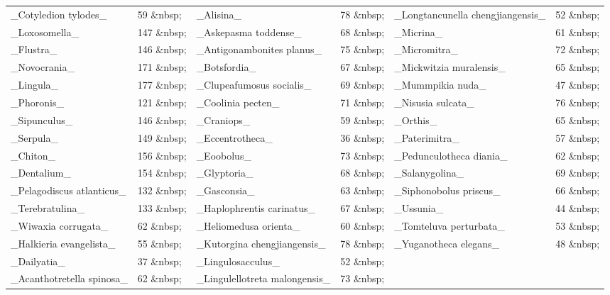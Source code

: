\documentclass[openany]{book}
\theoremstyle{definition}
\theoremstyle{definition}
\theoremstyle{definition}
\theoremstyle{remark}
\begin{document}
\begin{tabular}{l|l|l|l|l|l}
\hline
 &  &  &  &  & \\
\hline
\_Cotyledion tylodes\_ & 59   \&nbsp; & \_Alisina\_ & 78   \&nbsp; & \_Longtancunella chengjiangensis\_ & 52   \&nbsp;\\
\hline
\_Loxosomella\_ & 147   \&nbsp; & \_Askepasma toddense\_ & 68   \&nbsp; & \_Micrina\_ & 61   \&nbsp;\\
\hline
\_Flustra\_ & 146   \&nbsp; & \_Antigonambonites planus\_ & 75   \&nbsp; & \_Micromitra\_ & 72   \&nbsp;\\
\hline
\_Novocrania\_ & 171   \&nbsp; & \_Botsfordia\_ & 67   \&nbsp; & \_Mickwitzia muralensis\_ & 65   \&nbsp;\\
\hline
\_Lingula\_ & 177   \&nbsp; & \_Clupeafumosus socialis\_ & 69   \&nbsp; & \_Mummpikia nuda\_ & 47   \&nbsp;\\
\hline
\_Phoronis\_ & 121   \&nbsp; & \_Coolinia pecten\_ & 71   \&nbsp; & \_Nisusia sulcata\_ & 76   \&nbsp;\\
\hline
\_Sipunculus\_ & 146   \&nbsp; & \_Craniops\_ & 59   \&nbsp; & \_Orthis\_ & 65   \&nbsp;\\
\hline
\_Serpula\_ & 149   \&nbsp; & \_Eccentrotheca\_ & 36   \&nbsp; & \_Paterimitra\_ & 57   \&nbsp;\\
\hline
\_Chiton\_ & 156   \&nbsp; & \_Eoobolus\_ & 73   \&nbsp; & \_Pedunculotheca diania\_ & 62   \&nbsp;\\
\hline
\_Dentalium\_ & 154   \&nbsp; & \_Glyptoria\_ & 68   \&nbsp; & \_Salanygolina\_ & 69   \&nbsp;\\
\hline
\_Pelagodiscus atlanticus\_ & 132   \&nbsp; & \_Gasconsia\_ & 63   \&nbsp; & \_Siphonobolus priscus\_ & 66   \&nbsp;\\
\hline
\_Terebratulina\_ & 133   \&nbsp; & \_Haplophrentis carinatus\_ & 67   \&nbsp; & \_Ussunia\_ & 44   \&nbsp;\\
\hline
\_Wiwaxia corrugata\_ & 62   \&nbsp; & \_Heliomedusa orienta\_ & 60   \&nbsp; & \_Tomteluva perturbata\_ & 53   \&nbsp;\\
\hline
\_Halkieria evangelista\_ & 55   \&nbsp; & \_Kutorgina chengjiangensis\_ & 78   \&nbsp; & \_Yuganotheca elegans\_ & 48   \&nbsp;\\
\hline
\_Dailyatia\_ & 37   \&nbsp; & \_Lingulosacculus\_ & 52   \&nbsp; &  & \\
\hline
\_Acanthotretella spinosa\_ & 62   \&nbsp; & \_Lingulellotreta malongensis\_ & 73   \&nbsp; &  & \\
\hline
\end{tabular}
\end{document}
